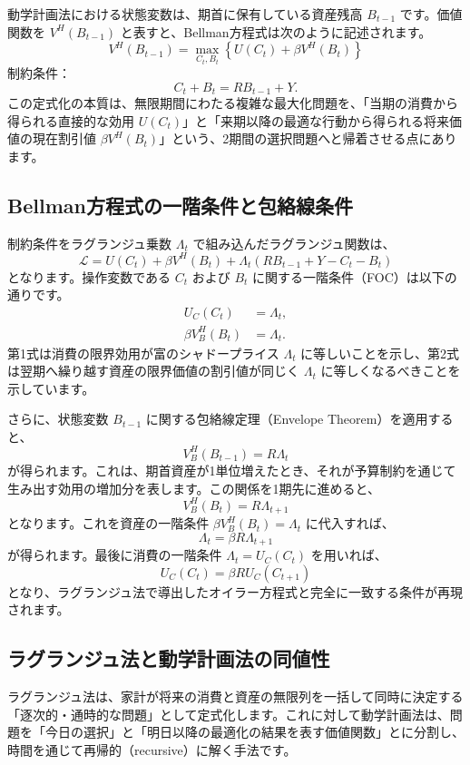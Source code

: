 \documentclass[
  japanese,
  lualatex,
  ja=standard,
  12pt,
  a4paper]{ltjsarticle}
\begin{document}
動学計画法における状態変数は、期首に保有している資産残高 \(B_{t-1}\)
です。価値関数を \(V^H(B_{t-1})\)
と表すと、Bellman方程式は次のように記述されます。 \[
V^H(B_{t-1}) = \max_{C_t, B_t} \left\{ U(C_t) + \beta V^H(B_t) \right\}
\] 制約条件： \[
C_t + B_t = R B_{t-1} + Y.
\]
この定式化の本質は、無限期間にわたる複雑な最大化問題を、「当期の消費から得られる直接的な効用
\(U(C_t)\)」と「来期以降の最適な行動から得られる将来価値の現在割引値
\(\beta V^H(B_t)\)」という、2期間の選択問題へと帰着させる点にあります。

\subsection{Bellman方程式の一階条件と包絡線条件}\label{bellmanux65b9ux7a0bux5f0fux306eux4e00ux968eux6761ux4ef6ux3068ux5305ux7d61ux7ddaux6761ux4ef6}

制約条件をラグランジュ乗数 \(\Lambda_t\)
で組み込んだラグランジュ関数は、 \[
\mathcal{L} = U(C_t) + \beta V^H(B_t) + \Lambda_t \left( R B_{t-1} + Y - C_t - B_t \right)
\] となります。操作変数である \(C_t\) および \(B_t\)
に関する一階条件（FOC）は以下の通りです。 \[
\begin{aligned}
U_C(C_t) &= \Lambda_t,\\
\beta V^H_B(B_t) &= \Lambda_t.
\end{aligned}
\] 第1式は消費の限界効用が富のシャドープライス \(\Lambda_t\)
に等しいことを示し、第2式は翌期へ繰り越す資産の限界価値の割引値が同じく
\(\Lambda_t\) に等しくなるべきことを示しています。

さらに、状態変数 \(B_{t-1}\) に関する包絡線定理（Envelope
Theorem）を適用すると、 \[
V^H_B(B_{t-1}) = R \Lambda_t
\]
が得られます。これは、期首資産が1単位増えたとき、それが予算制約を通じて生み出す効用の増加分を表します。この関係を1期先に進めると、
\[
V^H_B(B_t) = R \Lambda_{t+1}
\] となります。これを資産の一階条件 \(\beta V^H_B(B_t) = \Lambda_t\)
に代入すれば、 \[
\Lambda_t = \beta R \Lambda_{t+1}
\] が得られます。最後に消費の一階条件 \(\Lambda_t = U_C(C_t)\)
を用いれば、 \[
U_C(C_t) = \beta R U_C(C_{t+1})
\]
となり、ラグランジュ法で導出したオイラー方程式と完全に一致する条件が再現されます。

\subsection{ラグランジュ法と動学計画法の同値性}\label{ux30e9ux30b0ux30e9ux30f3ux30b8ux30e5ux6cd5ux3068ux52d5ux5b66ux8a08ux753bux6cd5ux306eux540cux5024ux6027}

ラグランジュ法は、家計が将来の消費と資産の無限列を一括して同時に決定する「逐次的・通時的な問題」として定式化します。これに対して動学計画法は、問題を「今日の選択」と「明日以降の最適化の結果を表す価値関数」とに分割し、時間を通じて再帰的（recursive）に解く手法です。
\end{document}
